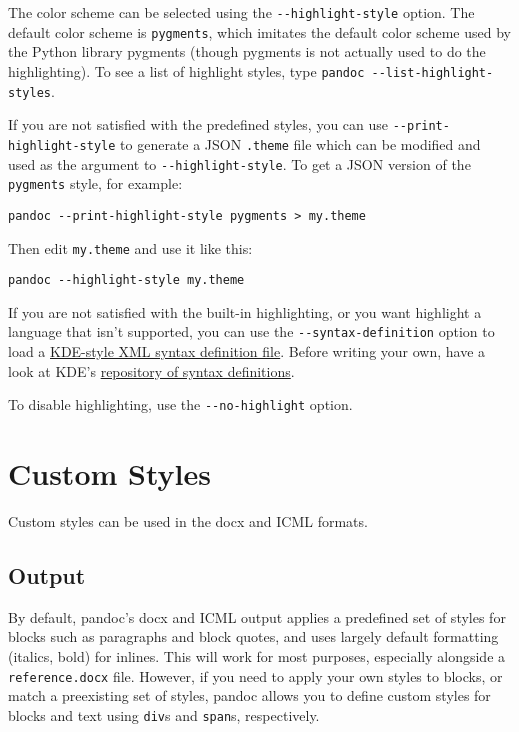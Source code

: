 \documentclass[
]{article}
\begin{document}
The color scheme can be selected using the \texttt{-\/-highlight-style}
option. The default color scheme is \texttt{pygments}, which imitates
the default color scheme used by the Python library pygments (though
pygments is not actually used to do the highlighting). To see a list of
highlight styles, type \texttt{pandoc\ -\/-list-highlight-styles}.

If you are not satisfied with the predefined styles, you can use
\texttt{-\/-print-highlight-style} to generate a JSON \texttt{.theme}
file which can be modified and used as the argument to
\texttt{-\/-highlight-style}. To get a JSON version of the
\texttt{pygments} style, for example:

\begin{verbatim}
pandoc --print-highlight-style pygments > my.theme
\end{verbatim}

Then edit \texttt{my.theme} and use it like this:

\begin{verbatim}
pandoc --highlight-style my.theme
\end{verbatim}

If you are not satisfied with the built-in highlighting, or you want
highlight a language that isn't supported, you can use the
\texttt{-\/-syntax-definition} option to load a
\href{https://docs.kde.org/stable5/en/applications/katepart/highlight.html}{KDE-style
XML syntax definition file}. Before writing your own, have a look at
KDE's
\href{https://github.com/KDE/syntax-highlighting/tree/master/data/syntax}{repository
of syntax definitions}.

To disable highlighting, use the \texttt{-\/-no-highlight} option.

\hypertarget{custom-styles}{%
\section{Custom Styles}\label{custom-styles}}

Custom styles can be used in the docx and ICML formats.

\hypertarget{output}{%
\subsection{Output}\label{output}}

By default, pandoc's docx and ICML output applies a predefined set of
styles for blocks such as paragraphs and block quotes, and uses largely
default formatting (italics, bold) for inlines. This will work for most
purposes, especially alongside a \texttt{reference.docx} file. However,
if you need to apply your own styles to blocks, or match a preexisting
set of styles, pandoc allows you to define custom styles for blocks and
text using \texttt{div}s and \texttt{span}s, respectively.
\end{document}
